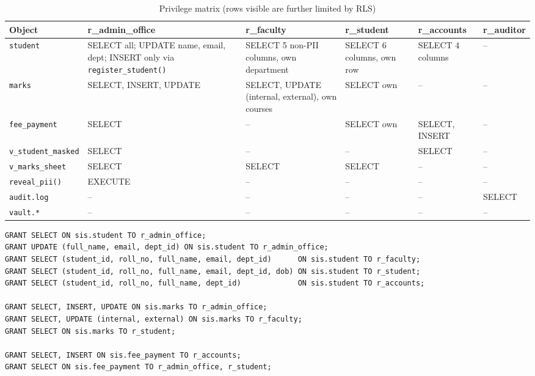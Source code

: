 \documentclass[11pt,a4paper]{report}
\begin{document}
\begin{table}[H]
    \centering
    \caption{Privilege matrix (rows visible are further limited by RLS)}
    \label{tab:matrix}
    \scriptsize
    \setlength{\tabcolsep}{3pt}
    \begin{tabularx}{\textwidth}{|l|Y|Y|Y|Y|Y|}
        \hline
        \textbf{Object} & \textbf{r\_admin\_office} & \textbf{r\_faculty} & \textbf{r\_student} & \textbf{r\_accounts} & \textbf{r\_auditor} \\ \hline
        \texttt{student} & SELECT all; UPDATE name, email, dept; INSERT only via \texttt{register\_}\allowbreak\texttt{student()} & SELECT 5 non-PII columns, own department & SELECT 6 columns, own row & SELECT 4 columns & -- \\ \hline
        \texttt{marks} & SELECT, INSERT, UPDATE & SELECT, UPDATE (internal, external), own courses & SELECT own & -- & -- \\ \hline
        \texttt{fee\_payment} & SELECT & -- & SELECT own & SELECT, INSERT & -- \\ \hline
        \texttt{v\_student\_masked} & SELECT & -- & -- & SELECT & -- \\ \hline
        \texttt{v\_marks\_sheet} & SELECT & SELECT & SELECT & -- & -- \\ \hline
        \texttt{reveal\_pii()} & EXECUTE & -- & -- & -- & -- \\ \hline
        \texttt{audit.log} & -- & -- & -- & -- & SELECT \\ \hline
        \texttt{vault.*} & -- & -- & -- & -- & -- \\ \hline
    \end{tabularx}
\end{table}

\begin{lstlisting}[caption={Column-level least-privilege grants (from \texttt{04\_access\_control.sql})}]
GRANT SELECT ON sis.student TO r_admin_office;
GRANT UPDATE (full_name, email, dept_id) ON sis.student TO r_admin_office;
GRANT SELECT (student_id, roll_no, full_name, email, dept_id)      ON sis.student TO r_faculty;
GRANT SELECT (student_id, roll_no, full_name, email, dept_id, dob) ON sis.student TO r_student;
GRANT SELECT (student_id, roll_no, full_name, dept_id)             ON sis.student TO r_accounts;

GRANT SELECT, INSERT, UPDATE ON sis.marks TO r_admin_office;
GRANT SELECT, UPDATE (internal, external) ON sis.marks TO r_faculty;
GRANT SELECT ON sis.marks TO r_student;

GRANT SELECT, INSERT ON sis.fee_payment TO r_accounts;
GRANT SELECT ON sis.fee_payment TO r_admin_office, r_student;
\end{lstlisting}
\end{document}
